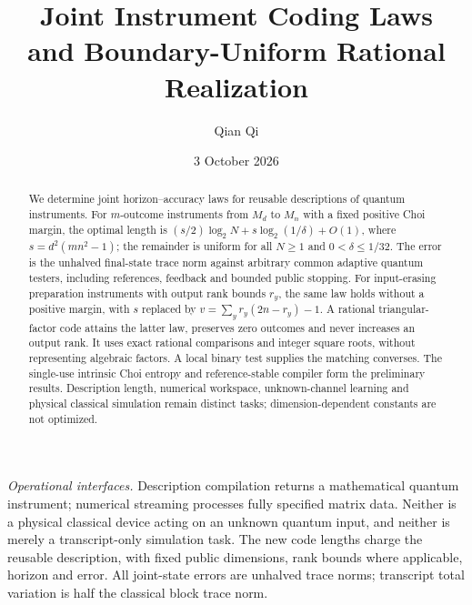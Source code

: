 \documentclass[11pt]{amsart}
\title[Joint instrument coding laws]{Joint Instrument Coding Laws\\and Boundary-Uniform Rational Realization}
\author{Qian Qi}
\date{3 October 2026}
\numberwithin{equation}{section}
\theoremstyle{definition}\newtheorem{definition}[theorem]{Definition}
\theoremstyle{remark}\newtheorem{remark}[theorem]{Remark}
\begin{document}
\raggedbottom
\begin{abstract}
We determine joint horizon--accuracy laws for reusable descriptions of
quantum instruments. For $m$-outcome instruments from $M_d$ to $M_n$
with a fixed positive Choi margin, the optimal length is
$(s/2)\log_2N+s\log_2(1/\delta)+O(1)$, where
$s=d^2(mn^2-1)$; the remainder is uniform for all $N\ge1$ and
$0<\delta\le1/32$. The error is the unhalved final-state trace norm
against arbitrary common adaptive quantum testers, including references,
feedback and bounded public stopping. For input-erasing preparation
instruments with output rank bounds $r_y$, the same law holds without
a positive margin, with $s$ replaced by
$v=\sum_y r_y(2n-r_y)-1$. A rational triangular-factor code attains
the latter law, preserves zero outcomes and never increases an output
rank. It uses exact rational comparisons and integer square roots,
without representing algebraic factors. A local binary test supplies
the matching converses. The single-use intrinsic Choi
entropy and reference-stable compiler form the preliminary results. Description length, numerical workspace,
unknown-channel learning and physical classical simulation remain
distinct tasks; dimension-dependent constants are not optimized.
\end{abstract}
\maketitle
\noindent\textit{Operational interfaces.}
Description compilation returns a mathematical quantum instrument;
numerical streaming processes fully specified matrix data. Neither is a
physical classical device acting on an unknown quantum input, and
neither is merely a transcript-only simulation task. The new code lengths
charge the reusable description, with fixed public dimensions, rank bounds where applicable, horizon and error.
All joint-state errors
are unhalved trace norms; transcript total variation is half the classical
block trace norm.










\end{document}
